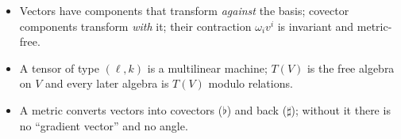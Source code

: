 \begin{keypoints}
\begin{itemize}
\item Vectors have components that transform \emph{against} the basis; covector components transform \emph{with} it; their contraction $\omega_iv^i$ is invariant and metric-free.
\item A tensor of type $(\ell,k)$ is a multilinear machine; $T(V)$ is the free algebra on $V$ and every later algebra is $T(V)$ modulo relations.
\item A metric converts vectors into covectors ($\flat$) and back ($\sharp$); without it there is no ``gradient vector'' and no angle.
\end{itemize}
\end{keypoints}
